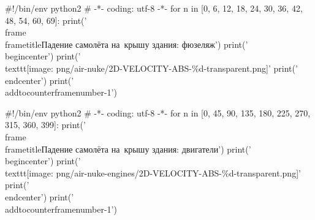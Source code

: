\documentclass[xcolor={usenames,dvipsnames,svgnames,table}]{beamer}
\begin{document}
\begin{python}
#!/bin/env python2
# -*- coding: utf-8 -*-
for n in [0, 6, 12, 18, 24, 30, 36, 42, 48, 54, 60, 69]:
    print('\\frame{\\frametitle{Падение самолёта на~крышу здания: фюзеляж}')
    print('\\begin{center}')
    print('\\texttt{[image: png/air-nuke/2D-VELOCITY-ABS-\%d-transparent.png]}' %
    print('\\end{center}}')
    print('\\addtocounter{framenumber}{-1}')
\end{python}

\addtocounter{framenumber}{+1}

\begin{python}
#!/bin/env python2
# -*- coding: utf-8 -*-
for n in [0, 45, 90, 135, 180, 225, 270, 315, 360, 399]:
    print('\\frame{\\frametitle{Падение самолёта на~крышу здания: двигатели}')
    print('\\begin{center}')
    print('\\texttt{[image: png/air-nuke-engines/2D-VELOCITY-ABS-\%d-transparent.png]}' %
    print('\\end{center}}')
    print('\\addtocounter{framenumber}{-1}')
\end{python}
\end{document}
